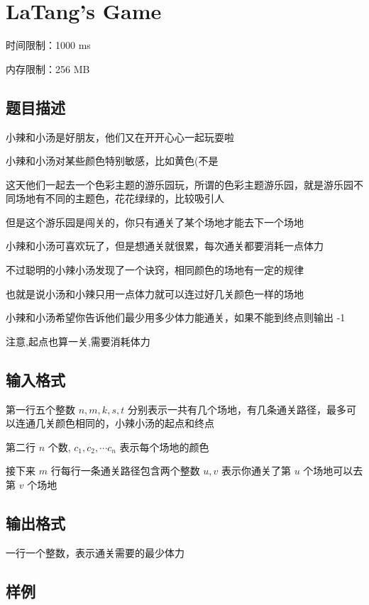 \documentclass[UTF8]{ctexart}
\begin{document}
\newpage
\section{LaTang's Game}

时间限制：1000 ms

内存限制：256 MB

\subsection{题目描述}

小辣和小汤是好朋友，他们又在开开心心一起玩耍啦

小辣和小汤对某些颜色特别敏感，比如黄色(不是

这天他们一起去一个色彩主题的游乐园玩，所谓的色彩主题游乐园，就是游乐园不同场地有不同的主题色，花花绿绿的，比较吸引人

但是这个游乐园是闯关的，你只有通关了某个场地才能去下一个场地

小辣和小汤可喜欢玩了，但是想通关就很累，每次通关都要消耗一点体力

不过聪明的小辣小汤发现了一个诀窍，相同颜色的场地有一定的规律

也就是说小汤和小辣只用一点体力就可以连过好几关颜色一样的场地

小辣和小汤希望你告诉他们最少用多少体力能通关，如果不能到终点则输出 -1

注意,起点也算一关,需要消耗体力

\subsection{输入格式}

第一行五个整数 $n, m, k, s, t$ 分别表示一共有几个场地，有几条通关路径，最多可以连通几关颜色相同的，小辣小汤的起点和终点

第二行 $n$ 个数, $c_1, c_2, \cdots c_n$ 表示每个场地的颜色

接下来 $m$ 行每行一条通关路径包含两个整数 $u, v$ 表示你通关了第 $u$ 个场地可以去第 $v$ 个场地

\subsection{输出格式}

一行一个整数，表示通关需要的最少体力

\subsection{样例}
\end{document}
